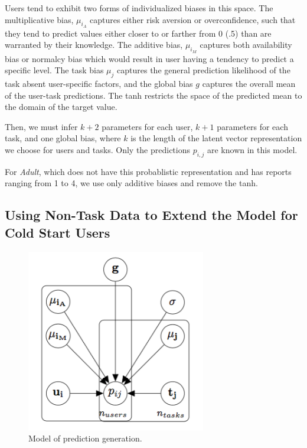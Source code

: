 \documentclass{article}
\begin{document}
Users tend to exhibit two forms of individualized biases in this space. The multiplicative bias, $\mu_{i_A}$ captures either risk aversion or overconfidence, such that they tend to predict values either closer to or farther from 0 (.5) than are warranted by their knowledge. The additive bias, $ \mu_{i_M}$ captures both availability bias or normalcy bias which would result in user having a tendency to predict a specific level. The task bias $\mu_j$ captures the general prediction likelihood of the task absent user-specific factors, and the global bias $g$ captures the overall mean of the user-task predictions.
  The tanh restricts the space of the predicted mean to the domain of the target value.
  
  Then, we must infer $k+2$ parameters for each user, $k+1$ parameters for each task, and one global bias, where $k$ is the length of the latent vector representation we choose for users and tasks. Only the predictions $p_{i,j}$ are known in this model.
  
      For \emph{Adult}, which does not have this probablistic representation and has reports ranging from 1 to 4, we use only additive biases and remove the tanh.
      
\subsection{Using Non-Task Data to Extend the Model for Cold Start Users}\label{ssec:non-task}

\begin{figure}[t]
  \centering
  \includegraphics[height=8cm]{dgmaccurate.png}
  \caption{\label{fig:diagram} Model of prediction generation.}
\end{figure}
 
\end{document}
